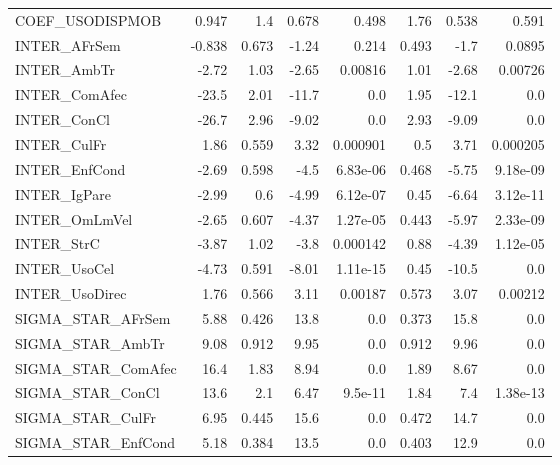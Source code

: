 \begin{tabular}{lrrrrrrr}
COEF\_USODISPMOB     &  0.947 &      1.4 &   0.678 &    0.498 &          1.76 &        0.538 &         0.591 \\
INTER\_AFrSem        & -0.838 &    0.673 &   -1.24 &    0.214 &         0.493 &         -1.7 &        0.0895 \\
INTER\_AmbTr         &  -2.72 &     1.03 &   -2.65 &  0.00816 &          1.01 &        -2.68 &       0.00726 \\
INTER\_ComAfec       &  -23.5 &     2.01 &   -11.7 &      0.0 &          1.95 &        -12.1 &           0.0 \\
INTER\_ConCl         &  -26.7 &     2.96 &   -9.02 &      0.0 &          2.93 &        -9.09 &           0.0 \\
INTER\_CulFr         &   1.86 &    0.559 &    3.32 & 0.000901 &           0.5 &         3.71 &      0.000205 \\
INTER\_EnfCond       &  -2.69 &    0.598 &    -4.5 & 6.83e-06 &         0.468 &        -5.75 &      9.18e-09 \\
INTER\_IgPare        &  -2.99 &      0.6 &   -4.99 & 6.12e-07 &          0.45 &        -6.64 &      3.12e-11 \\
INTER\_OmLmVel       &  -2.65 &    0.607 &   -4.37 & 1.27e-05 &         0.443 &        -5.97 &      2.33e-09 \\
INTER\_StrC          &  -3.87 &     1.02 &    -3.8 & 0.000142 &          0.88 &        -4.39 &      1.12e-05 \\
INTER\_UsoCel        &  -4.73 &    0.591 &   -8.01 & 1.11e-15 &          0.45 &        -10.5 &           0.0 \\
INTER\_UsoDirec      &   1.76 &    0.566 &    3.11 &  0.00187 &         0.573 &         3.07 &       0.00212 \\
SIGMA\_STAR\_AFrSem   &   5.88 &    0.426 &    13.8 &      0.0 &         0.373 &         15.8 &           0.0 \\
SIGMA\_STAR\_AmbTr    &   9.08 &    0.912 &    9.95 &      0.0 &         0.912 &         9.96 &           0.0 \\
SIGMA\_STAR\_ComAfec  &   16.4 &     1.83 &    8.94 &      0.0 &          1.89 &         8.67 &           0.0 \\
SIGMA\_STAR\_ConCl    &   13.6 &      2.1 &    6.47 &  9.5e-11 &          1.84 &          7.4 &      1.38e-13 \\
SIGMA\_STAR\_CulFr    &   6.95 &    0.445 &    15.6 &      0.0 &         0.472 &         14.7 &           0.0 \\
SIGMA\_STAR\_EnfCond  &   5.18 &    0.384 &    13.5 &      0.0 &         0.403 &         12.9 &           0.0 \\

\end{tabular}
